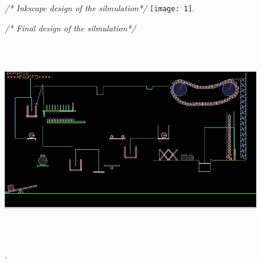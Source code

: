 \documentclass[a4paper]{article}
\begin{document}
	
	\begin{figure}[H]
	\centering
	\textit{/* Inkscape design of the silmulation*/}
	\texttt{[image: 1]}.
	\end{figure}
	\newpage
	
	
	
	\begin{figure}[H]
	\centering
	\vspace{20pt}
	\textit{/* Final design of the silmulation*/}
	\includegraphics[width=180mm,height=95mm]{2}.
	\end{figure}
	
	\vspace{15pt}
	
\end{document}
